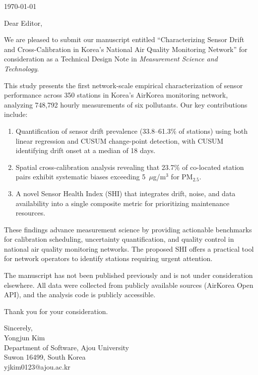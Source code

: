\documentclass[12pt]{article}
\begin{document}
\pagestyle{empty}

\noindent\today

\vspace{1em}
\noindent Dear Editor,

\vspace{1em}
\noindent We are pleased to submit our manuscript entitled ``Characterizing Sensor Drift and Cross-Calibration in Korea's National Air Quality Monitoring Network'' for consideration as a Technical Design Note in \textit{Measurement Science and Technology}.

This study presents the first network-scale empirical characterization of sensor performance across 350 stations in Korea's AirKorea monitoring network, analyzing 748,792 hourly measurements of six pollutants. Our key contributions include:

\begin{enumerate}
\item Quantification of sensor drift prevalence (33.8--61.3\% of stations) using both linear regression and CUSUM change-point detection, with CUSUM identifying drift onset at a median of 18 days.

\item Spatial cross-calibration analysis revealing that 23.7\% of co-located station pairs exhibit systematic biases exceeding 5~$\mu$g/m$^3$ for PM$_{2.5}$.

\item A novel Sensor Health Index (SHI) that integrates drift, noise, and data availability into a single composite metric for prioritizing maintenance resources.
\end{enumerate}

These findings advance measurement science by providing actionable benchmarks for calibration scheduling, uncertainty quantification, and quality control in national air quality monitoring networks. The proposed SHI offers a practical tool for network operators to identify stations requiring urgent attention.

The manuscript has not been published previously and is not under consideration elsewhere. All data were collected from publicly available sources (AirKorea Open API), and the analysis code is publicly accessible.

Thank you for your consideration.

\vspace{2em}
\noindent Sincerely,\\
Yongjun Kim\\
Department of Software, Ajou University\\
Suwon 16499, South Korea\\
yjkim0123@ajou.ac.kr
\end{document}
